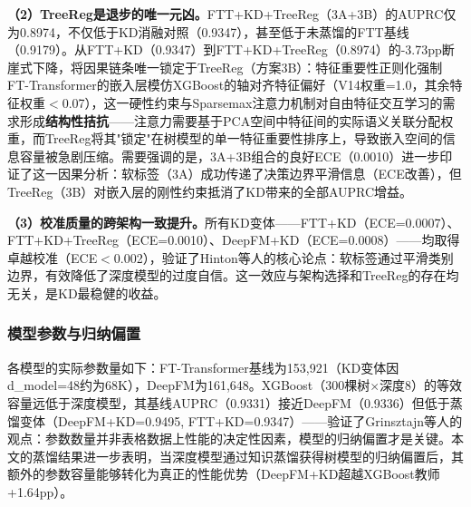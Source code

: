 \textbf{（2）TreeReg是退步的唯一元凶。}FTT+KD+TreeReg（3A+3B）的AUPRC仅为0.8974，不仅低于KD消融对照（0.9347），甚至低于未蒸馏的FTT基线（0.9179）。从FTT+KD（0.9347）到FTT+KD+TreeReg（0.8974）的-3.73pp断崖式下降，将因果链条唯一锁定于TreeReg（方案3B）：特征重要性正则化强制FT-Transformer的嵌入层模仿XGBoost的轴对齐特征偏好（V14权重=1.0，其余特征权重$<$0.07），这一硬性约束与Sparsemax注意力机制对自由特征交互学习的需求形成\textbf{结构性拮抗}——注意力需要基于PCA空间中特征间的实际语义关联分配权重，而TreeReg将其"锁定"在树模型的单一特征重要性排序上，导致嵌入空间的信息容量被急剧压缩。需要强调的是，3A+3B组合的良好ECE（0.0010）进一步印证了这一因果分析：软标签（3A）成功传递了决策边界平滑信息（ECE改善），但TreeReg（3B）对嵌入层的刚性约束抵消了KD带来的全部AUPRC增益。

\textbf{（3）校准质量的跨架构一致提升。}所有KD变体——FTT+KD（ECE=0.0007）、FTT+KD+TreeReg（ECE=0.0010）、DeepFM+KD（ECE=0.0008）——均取得卓越校准（ECE$<$0.002），验证了Hinton等人\cite{hinton2015distilling}的核心论点：软标签通过平滑类别边界，有效降低了深度模型的过度自信。这一效应与架构选择和TreeReg的存在均无关，是KD最稳健的收益。

\subsubsection{模型参数与归纳偏置}

各模型的实际参数量如下：FT-Transformer基线为153,921（KD变体因d\_model=48约为68K），DeepFM为161,648。XGBoost（300棵树$\times$深度8）的等效容量远低于深度模型，其基线AUPRC（0.9331）接近DeepFM（0.9336）但低于蒸馏变体（DeepFM+KD=0.9495, FTT+KD=0.9347）——验证了Grinsztajn等人\cite{grinsztajn2022tree}的观点：参数数量并非表格数据上性能的决定性因素，模型的归纳偏置才是关键。本文的蒸馏结果进一步表明，当深度模型通过知识蒸馏获得树模型的归纳偏置后，其额外的参数容量能够转化为真正的性能优势（DeepFM+KD超越XGBoost教师+1.64pp）。
